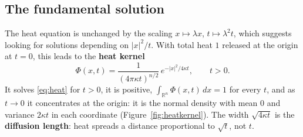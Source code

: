 \documentclass[11pt,a4paper]{article}
\numberwithin{equation}{section}
\theoremstyle{definition}
\begin{document}
\subsection{The fundamental solution}
\label{ssec:heatkernel}

The heat equation is unchanged by the scaling $x \mapsto \lambda x$, $t \mapsto \lambda^2t$, which suggests looking for solutions depending on $|x|^2/t$. With total heat $1$ released at the origin at $t = 0$, this leads to the \textbf{heat kernel}
\[
\Phi(x, t) = \frac{1}{(4\pi\kappa t)^{n/2}}\,e^{-|x|^2/4\kappa t}, \qquad t > 0 .
\]
It solves \eqref{eq:heat} for $t > 0$, it is positive, $\int_{\mathbb R^n}\Phi(x, t)\,dx = 1$ for every $t$, and as $t \to 0$ it concentrates at the origin: it is the normal density with mean $0$ and variance $2\kappa t$ in each coordinate (Figure~\ref{fig:heatkernel}). The width $\sqrt{4\kappa t}$ is the
\textbf{diffusion length}: heat spreads a distance proportional to $\sqrt t$, not $t$.
\end{document}

